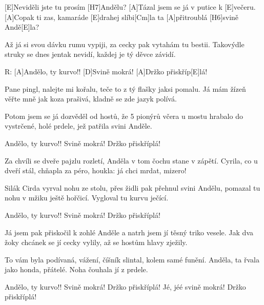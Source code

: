 
[E]Neviděli jste tu prosím [H7]Andělu?
[A]Tázal jsem se já v putice k [E]večeru.
[A]Copak ti zas, kamaráde [E]drahej slíbi[Cm]la
ta [A]přitroublá [H6]svině Andě[E]la?

Až já si svou dávku rumu vypiji,
za cecky pak vytahám tu bestii.
Takovýdle struky se dnes jentak nevidí,
každej je tý děvce závidí.

R:
[A]Andělo, ty kurvo!!
[D]Svině mokrá! [A]Držko přiskříp[E]lá!

Pane pingl, nalejte mi kořalu,
teče to z tý flašky jaksi pomalu.
Já mám žízeň věřte mně jak koza prašivá,
kladně se zde jazyk polívá.

Potom jsem se já dozvěděl od hostů,
že 5 pionýrů včera u mostu
hrabalo do vystrčené, holé prdele,
jež patřila svini Anděle.

Andělo, ty kurvo!!
Svině mokrá! Držko přiskříplá!
\slpc

Za chvíli se dveře pajzlu rozletí,
Anděla v tom čochu stane v zápětí.
Cyrila, co u dveří stál, chňapla za péro,
houkla: já chci mrdat, mizero!

Silák Cirda vyrval nohu ze stolu,
přes židli pak přehnul svini Andělu,
pomazal tu nohu v mžiku ještě hořčicí.
Vygloval tu kurvu ječící.

Andělo, ty kurvo!!
Svině mokrá! Držko přiskříplá!

Já jsem pak přiskočil k zohlé Anděle
a natrh jsem jí těsný triko vesele.
Jak dva žoky chcánek se jí cecky vylily,
až se hostům hlavy zježily.

To vám byla podívaná, vážení,
číšník slintal, kolem samé funění.
Anděla, ta řvala jako honda, přátelé.
Noha čouhala jí z prdele.

Andělo, ty kurvo!!
Svině mokrá! Držko přiskříplá!
Jé, jéé
svině mokrá! Držko přiskříplá!